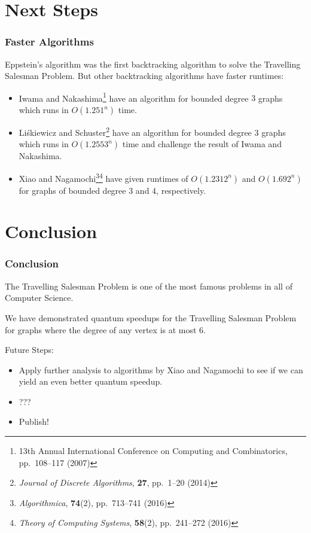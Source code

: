 \documentclass[]{beamer}
\begin{document}
\section{Next Steps}

\begin{frame}
\frametitle{Faster Algorithms}
Eppstein's algorithm was the first backtracking algorithm to solve the Travelling Salesman Problem. But other backtracking algorithms have faster runtimes:

\begin{itemize}
\item Iwama and Nakashima\footnote{13th Annual International Conference on Computing and Combinatorics, pp.\ 108--117 (2007)} have an algorithm for bounded degree $3$ graphs which runs in $O(1.251^n)$ time.
\item Li\'{s}kiewicz and Schuster\footnote{{\em Journal of Discrete Algorithms}, {\bf 27}, pp.\ 1--20 (2014)} have an algorithm for bounded degree $3$ graphs which runs in $O(1.2553^n)$ time and challenge the result of Iwama and Nakashima.
\item Xiao and Nagamochi\footnote{{\em Algorithmica}, {\bf 74}(2), pp.\ 713--741 (2016)}\footnote{{\em Theory of Computing Systems}, {\bf 58}(2), pp.\ 241--272 (2016)} have given runtimes of $O(1.2312^n)$ and $O(1.692^n)$ for graphs of bounded degree $3$ and $4$, respectively.
\end{itemize}
\end{frame}

\section{Conclusion}

\begin{frame}
\frametitle{Conclusion}
The Travelling Salesman Problem is one of the most famous problems in all of Computer Science.

We have demonstrated quantum speedups for the Travelling Salesman Problem for graphs where the degree of any vertex is at most $6$.

Future Steps:
\begin{itemize}
\item Apply further analysis to algorithms by Xiao and Nagamochi to see if we can yield an even better quantum speedup.
\item ???
\item Publish!
\end{itemize}
\end{frame}
\end{document}
